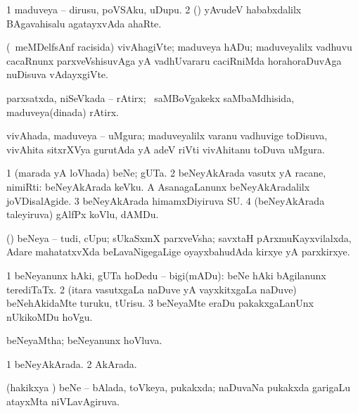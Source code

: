 \bentry
{} 
\gl{\nA}
\expl{}
\bmng
\bnum
\num{1} maduveya -- dirusu, poVSAku, uDupu. 
\num{2} (\rUpa) yAvudeV hababxdalilx BAgavahisalu agatayxvAda ahaRte. 
\enum
\emng
\eentry

\bentry
{} 
\gl{\nA}
\expl{}
\bmng
(\kanmu\ meMDelfsAnf racisida) vivAhagiVte; maduveya hADu; maduveyalilx vadhuvu cacaRnunx parxveVshisuvAga yA vadhUvararu caciRniMda horahoraDuvAga nuDisuva vAdayxgiVte. 
\emng
\eentry

\bentry
{} 
\gl{\nA}
\expl{}
\bmng
parxsatxda, niSeVkada -- rAtirx; \kanmu\ saMBoVgakekx saMbaMdhisida, maduveya(dinada) rAtirx. 
\emng
\eentry

\bentry
{} 
\gl{\nA}
\expl{}
\bmng
vivAhada, maduveya -- uMgura; maduveyalilx varanu vadhuvige toDisuva, vivAhita sitxrXVya gurutAda yA adeV riVti vivAhitanu toDuva uMgura. 
\emng
\eentry

\bentry
{} 
\gl{\nA}
\expl{}
\bmng
\bnum
\num{1} (marada yA loVhada) beNe; gUTa. 
\num{2} beNeyAkArada vasutx yA racane, nimiRti:  beNeyAkArada keVku.  A AsanagaLanunx beNeyAkAradalilx joVDisalAgide. 
\num{3} beNeyAkArada himamxDiyiruva SU. 
\num{4} (beNeyAkArada taleyiruva) gAlfPx koVlu, dAMDu. 
\enum
\emng

\noindent 
\gl{\pagu}
\expl{}
\bmng
{}  (\AmA) beNeya -- tudi, cUpu; sUkaSxmX parxveVsha; savxtaH pArxmuKayxvilalxda, Adare mahatatxvXda beLavaNigegaLige oyayxbahudAda kirxye yA parxkirxye. 
\emng
\eentry

\bentry
{} 
\gl{\sakirx}
\expl{}
\bmng
\bnum
\num{1} beNeyanunx hAki, gUTa hoDedu -- bigi(mADu):  beNe hAki bAgilanunx terediTaTx. 
\num{2} (itara vasutxgaLa naDuve yA vayxkitxgaLa naDuve) beNehAkidaMte turuku, tUrisu. 
\num{3} beNeyaMte eraDu pakakxgaLanUnx nUkikoMDu hoVgu. 
\enum
\emng
\eentry

\bentry
{} 
\gl{\gu}
\expl{}
\bmng
beNeyaMtha; beNeyanunx hoVluva. 
\emng
\eentry

\bentry
{} 
\gl{\gu}
\expl{}
\bmng
\bnum
\num{1} beNeyAkArada. 
\num{2}  AkArada. 
\enum
\emng
\eentry

\bentry
{} 
\gl{\gu}
\expl{}
\bmng
(hakikxya \vi) beNe -- bAlada, toVkeya, pukakxda; naDuvaNa pukakxda garigaLu atayxMta niVLavAgiruva. 
\emng
\eentry

